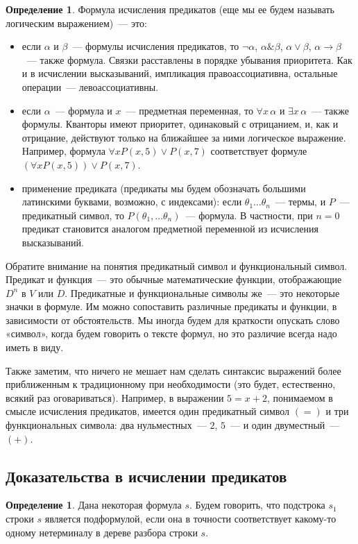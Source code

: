 \documentclass[a4paper,11pt]{article}
\theoremstyle{definition}
\newtheorem{dfn}[thm]{Определение}
\newcommand{\amp}{\mathbin{\&}}
\begin{document}
\begin{dfn}
Формула исчисления предикатов (еще мы ее будем называть логическим выражением)~---
это:
\begin{itemize}
\item если $\alpha$ и $\beta$~--- формулы исчисления предикатов, то $\neg\alpha$,
  $\alpha \amp \beta$, $\alpha \vee \beta$, $\alpha \to \beta$~--- также
  формула. Связки расставлены в порядке убывания приоритета. Как и в исчислении
  высказываний, импликация правоассоциативна, остальные операции~---
  левоассоциативны.
\item если $\alpha$~--- формула и $x$~--- предметная переменная, то
  $\forall x\,\alpha$ и $\exists x\,\alpha$~--- также формулы. Кванторы имеют
  приоритет, одинаковый с отрицанием, и, как и отрицание, действуют только на
  ближайшее за ними логическое выражение. Например, формула
  $\forall x P(x, 5) \vee P(x, 7)$ соответствует формуле
  $(\forall x P(x, 5)) \vee P(x, 7)$.
\item применение предиката (предикаты мы будем обозначать большими латинскими
  буквами, возможно, с индексами): если $\theta_1 \dots \theta_n$~--- термы, и
  $P$~--- предикатный символ, то $P(\theta_1, \dots \theta_n)$~--- формула. В
  частности, при $n = 0$ предикат становится аналогом предметной переменной из
  исчисления высказываний.
\end{itemize}
\end{dfn}

Обратите внимание на понятия предикатный символ и функциональный символ.
Предикат и функция~--- это обычные математические функции, отображающие $D^n$ в
$V$ или $D$. Предикатные и функциональные символы же~--- это некоторые значки в
формуле. Им можно сопоставить различные предикаты и функции, в зависимости от
обстоятельств. Мы иногда будем для краткости опускать слово «символ», когда
будем говорить о тексте формул, но это различие всегда надо иметь в виду.

Также заметим, что ничего не мешает нам сделать синтаксис выражений более
приближенным к традиционному при необходимости (это будет, естественно, всякий
раз оговариваться). Например, в выражении $5 = x + 2$, понимаемом в смысле
исчисления предикатов, имеется один предикатный символ $(=)$ и три
функциональных символа: два нульместных~--- $2$, $5$~--- и один двуместный~---
$(+)$.

\subsection{Доказательства в исчислении предикатов}
\begin{dfn}
Дана некоторая формула $s$. Будем говорить, что подстрока $s_1$ строки $s$
является подформулой, если она в точности соответствует какому-то одному
нетерминалу в дереве разбора строки $s$.
\end{dfn}
\end{document}
